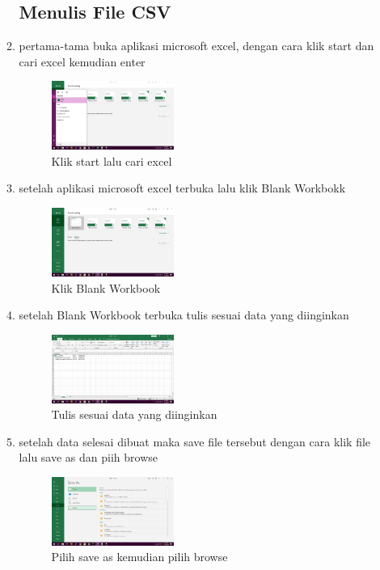 \begin{enumerate}
\begin{enumerate}
\subsection{Menulis File CSV}
\item pertama-tama buka aplikasi microsoft excel, dengan cara klik start dan cari excel kemudian enter
	\begin{figure}[H]
			\includegraphics[width=4cm]{figures/1184065/1.png}
			\centering
			\caption{Klik start lalu cari excel}
	\end{figure} 
\item setelah aplikasi microsoft excel terbuka lalu klik Blank Workbokk
 	\begin{figure}[H]
			\includegraphics[width=4cm]{figures/1184065/2.png}
			\centering
			\caption{Klik Blank Workbook}
	\end{figure} 
\item setelah Blank Workbook terbuka tulis sesuai data yang diinginkan 
 	\begin{figure}[H]
			\includegraphics[width=4cm]{figures/1184065/3.png}
			\centering
			\caption{Tulis sesuai data yang diinginkan}
	\end{figure} 
\item setelah data selesai dibuat maka save file tersebut dengan cara klik file lalu save as dan piih browse
 	\begin{figure}[H]
			\includegraphics[width=4cm]{figures/1184065/4.png}
			\centering
			\caption{Pilih save as kemudian pilih browse}

\end{figure}
\end{enumerate}
\end{enumerate}
